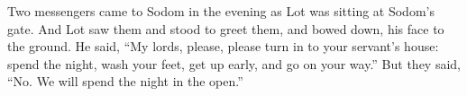 
\begin{inparaenum}
     Two messengers came to Sodom in the evening as Lot was sitting at Sodom's gate. And Lot saw them and stood to greet them, and bowed down, his face to the ground.%
     He said, ``My lords, please, please turn in to your servant's house: spend the night, wash your feet, get up early, and go on your way.'' But they said, ``No. We will spend the night in the open.''%
    
\end{inparaenum}

